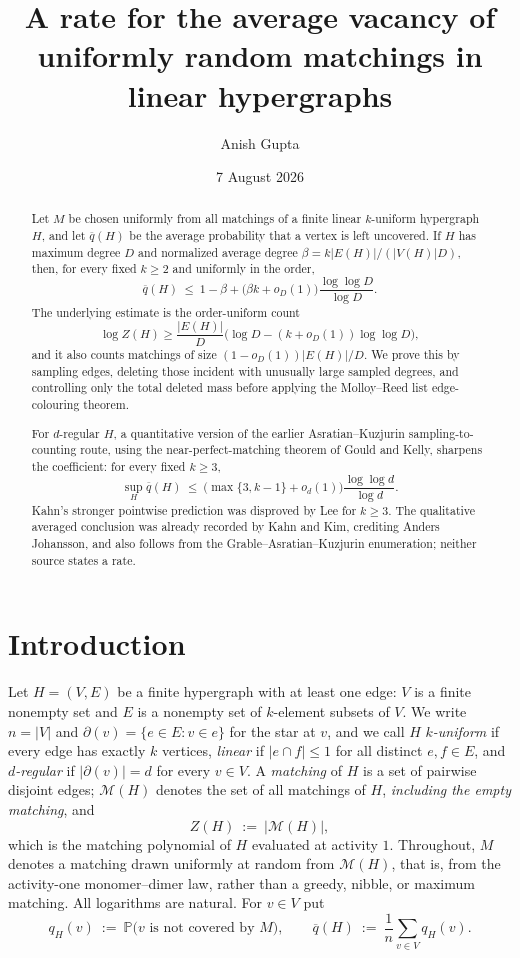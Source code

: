 \documentclass[11pt,a4paper]{amsart}
\title[Average vacancy of random hypergraph matchings]
  {A rate for the average vacancy of uniformly random matchings in linear hypergraphs}
\author{Anish Gupta}
\date{7 August 2026}
\theoremstyle{plain}
\theoremstyle{definition}
\theoremstyle{remark}
\newcommand{\VV}{V}
\newcommand{\EE}{E}
\newcommand{\Mat}{\mathcal{M}}
\newcommand{\PP}{\mathbb{P}}
\newcommand{\qbar}{\overline{q}}
\newcommand{\dg}{\partial}
\begin{document}
\begin{abstract}
Let $M$ be chosen uniformly from all matchings of a finite linear $k$-uniform hypergraph
$H$, and let $\qbar(H)$ be the average probability that a vertex is left uncovered. If
$H$ has maximum degree $D$ and normalized average degree
$\beta=k|E(H)|/(|V(H)|D)$, then, for every fixed $k\ge2$ and uniformly in the order,
\[
  \qbar(H)\ \le\ 1-\beta+\bigl(\beta k+o_D(1)\bigr)
  \frac{\log\log D}{\log D}.
\]
The underlying estimate is the order-uniform count
\[
  \log Z(H)\ge\frac{|E(H)|}{D}
    \bigl(\log D-(k+o_D(1))\log\log D\bigr),
\]
and it also counts matchings of size $(1-o_D(1))|E(H)|/D$. We prove this by sampling
edges, deleting those incident with unusually large sampled degrees, and controlling only
the total deleted mass before applying the Molloy--Reed list edge-colouring theorem.

For $d$-regular $H$, a quantitative version of the earlier Asratian--Kuzjurin
sampling-to-counting route, using the near-perfect-matching theorem of Gould and Kelly,
sharpens the coefficient: for every fixed $k\ge3$,
\[
  \sup_H\qbar(H)\ \le\
  \bigl(\max\{3,k-1\}+o_d(1)\bigr)\frac{\log\log d}{\log d}.
\]
Kahn's stronger pointwise prediction was disproved by Lee for $k\ge3$. The qualitative
averaged conclusion was already recorded by Kahn and Kim, crediting Anders Johansson,
and also follows from the Grable--Asratian--Kuzjurin enumeration; neither source states a
rate.
\end{abstract}

\maketitle

\section{Introduction}
\label{sec:intro}

Let $H=(\VV,\EE)$ be a finite hypergraph with at least one edge: $\VV$ is a finite
nonempty set and $\EE$ is a nonempty set of $k$-element subsets of $\VV$. We write $n=|\VV|$
and $\dg(v)=\{e\in\EE:v\in e\}$ for the star at $v$, and we call $H$ \emph{$k$-uniform} if
every edge has exactly $k$ vertices, \emph{linear} if $|e\cap f|\le1$ for all distinct
$e,f\in\EE$, and \emph{$d$-regular} if $|\dg(v)|=d$ for every $v\in\VV$. A \emph{matching}
of $H$ is a set of pairwise disjoint edges; $\Mat(H)$ denotes the set of all matchings of
$H$, \emph{including the empty matching}, and
\[
  Z(H)\ :=\ |\Mat(H)| ,
\]
which is the matching polynomial of $H$ evaluated at activity $1$. Throughout, $M$ denotes
a matching drawn uniformly at random from $\Mat(H)$, that is, from the activity-one
monomer--dimer law, rather than a greedy, nibble, or maximum matching. All logarithms are
natural. For $v\in\VV$ put
\[
  q_H(v)\ :=\ \PP\bigl(v\text{ is not covered by }M\bigr),
  \qquad
  \qbar(H)\ :=\ \frac1n\sum_{v\in\VV}q_H(v).
\]
\end{document}
